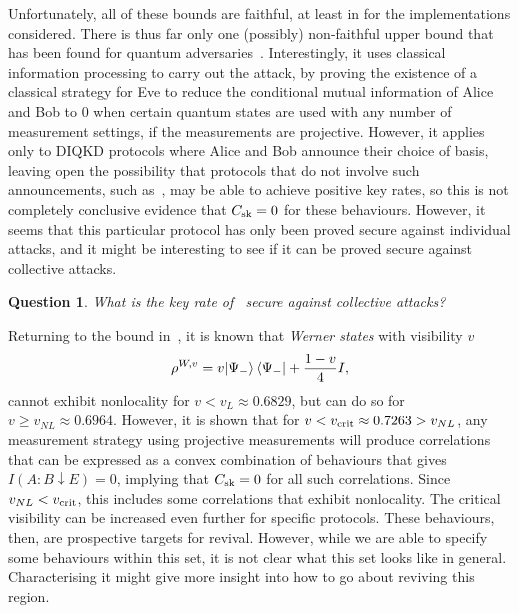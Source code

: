 \documentclass[10pt, a4paper]{article}
\numberwithin{equation}{section} %
\theoremstyle{definition}
\theoremstyle{plain}
\newtheorem{question}{Question}
\newcommand{\?}{\mathrel{?}} %
\newcommand{\sk}{\rm sk}
\newcommand{\crit}{\rm crit}
\begin{document}
      Unfortunately, all of these bounds are faithful, at least in for the implementations considered. There is thus far only one (possibly) non-faithful upper bound that has been found for quantum adversaries~\cite{NotSufficient}. Interestingly, it uses classical information processing to carry out the attack, by proving the existence of a classical strategy for Eve to reduce the conditional mutual information of Alice and Bob to 0 when certain quantum states are used with any number of measurement settings, if the measurements are projective. However, it applies only to DIQKD protocols where Alice and Bob announce their choice of basis, leaving open the possibility that protocols that do not involve such announcements, such as~\cite{NonstandardProtocol}, may be able to achieve positive key rates, so this is not completely conclusive evidence that \(C_{\sk} = 0\) for these behaviours. However, it seems that this particular protocol has only been proved secure against individual attacks, and it might be interesting to see if it can be proved secure against collective attacks.

      \begin{question}
        What is the key rate of~\cite{NonstandardProtocol} secure against collective attacks?
      \end{question}

      Returning to the bound in~\cite{NotSufficient}, it is known that \emph{Werner states} with visibility \(v\)
      \begin{equation}
        \rho^{W,v} = v{\ket{\Psi_-}\bra{\Psi_-}} + \frac{1-v}{4}I,
      \end{equation}
      cannot exhibit nonlocality for \(v < v_L \approx 0.6829\), but can do so for \(v \geq v_{NL} \approx 0.6964\). However, it is shown that for \(v < v_{\crit} \approx 0.7263 > v_{NL}\), any measurement strategy using projective measurements will produce correlations that can be expressed as a convex combination of behaviours that gives \(I(A:B \downarrow E) = 0\), implying that \(C_{\sk} = 0\) for all such correlations. Since \(v_{NL} < v_{\crit}\), this includes some correlations that exhibit nonlocality. The critical visibility can be increased even further for specific protocols. These behaviours, then, are prospective targets for revival. However, while we are able to specify some behaviours within this set, it is not clear what this set looks like in general. Characterising it might give more insight into how to go about reviving this region.
\end{document}
